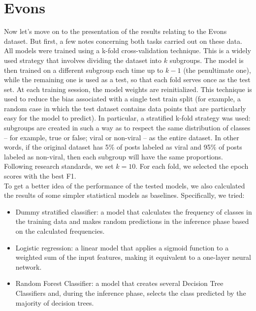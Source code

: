 \documentclass[a4paper,twoside,12pt]{book}
\begin{document}
\section{Evons}

Now let's move on to the presentation of the results relating to the Evons dataset. But first, a few notes concerning both tasks carried out on these data. All models were trained using a k-fold cross-validation technique. This is a widely used strategy that involves dividing the dataset into $k$ subgroups. The model is then trained on a different subgroup each time up to $k-1$ (the penultimate one), while the remaining one is used as a test, so that each fold serves once as the test set. At each training session, the model weights are reinitialized. This technique is used to reduce the bias associated with a single test train split (for example, a random case in which the test dataset contains data points that are particularly easy for the model to predict). In particular, a stratified k-fold strategy was used: subgroups are created in such a way as to respect the same distribution of classes -- for example, true or false; viral or non-viral -- as the entire dataset. In other words, if the original dataset has 5\% of posts labeled as viral and 95\% of posts labeled as non-viral, then each subgroup will have the same proportions. \\
Following research standards, we set $k=10$. For each fold, we selected the epoch scores with the best F1.\\

To get a better idea of the performance of the tested models, we also calculated the results of some simpler statistical models as baselines. Specifically, we tried:

\begin{itemize}
	\item Dummy stratified classifier: a model that calculates the frequency of classes in the training data and makes random predictions in the inference phase based on the calculated frequencies.
	
	\item Logistic regression: a linear model that applies a sigmoid function to a weighted sum of the input features, making it equivalent to a one-layer neural network.
	
	\item Random Forest Classifier: a model that creates several Decision Tree Classifiers and, during the inference phase, selects the class predicted by the majority of decision trees.
\end{itemize}
\end{document}
